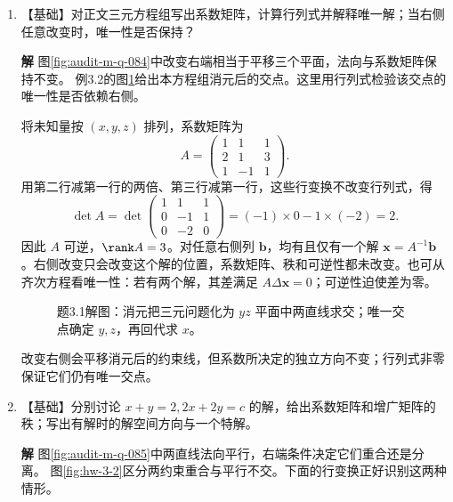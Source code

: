 \documentclass[11pt,openany,fontset=fandol]{ctexbook}
\theoremstyle{plain}\newtheorem{theorem}{定理}[chapter]\newtheorem{proposition}[theorem]{命题}
\theoremstyle{definition}\newtheorem{definition}{定义}[chapter]\newtheorem{example}{例}[chapter]
\theoremstyle{remark}\newtheorem*{remark}{说明}
\newcommand{\SolutionStart}{\par\nobreak\medskip\nobreak\noindent\textbf{解}\quad\ignorespaces}
\newenvironment{solution}{\SolutionStart}{\par\medskip}
\newcommand{\vct}[1]{\bm{#1}}\newcommand{\Rea}{\operatorname{Re}}\newcommand{\Ima}{\operatorname{Im}}
\begin{document}
\begin{enumerate}[label=3.\arabic*]
\item \begin{minipage}[t]{\linewidth}
【基础】对正文三元方程组写出系数矩阵，计算行列式并解释唯一解；当右侧任意改变时，唯一性是否保持？
\end{minipage}

\begin{solution}
图\ref{fig:audit-m-q-084}中改变右端相当于平移三个平面，法向与系数矩阵保持不变。
例3.2的图\ref{fig:hw-3-1}给出本方程组消元后的交点。这里用行列式检验该交点的唯一性是否依赖右侧。

将未知量按 $(x,y,z)$ 排列，系数矩阵为
\[
A=\begin{pmatrix}1&1&1\\2&1&3\\1&-1&1\end{pmatrix}.
\]
用第二行减第一行的两倍、第三行减第一行，这些行变换不改变行列式，得
\[
\det A=\det\begin{pmatrix}1&1&1\\0&-1&1\\0&-2&0\end{pmatrix}
=(-1)\times0-1\times(-2)=2.
\]
因此 $A$ 可逆，$\rank A=3$。对任意右侧列 $\vct b$，均有且仅有一个解 $\vct x=A^{-1}\vct b$。右侧改变只会改变这个解的位置，系数矩阵、秩和可逆性都未改变。也可从齐次方程看唯一性：若有两个解，其差满足 $A\Delta\vct x=0$；可逆性迫使差为零。

\begin{figure}[H]\centering
{}
\caption{题3.1解图：消元把三元问题化为 $yz$ 平面中两直线求交；唯一交点确定 $y,z$，再回代求 $x$。}\label{fig:hw-3-1}
\end{figure}

改变右侧会平移消元后的约束线，但系数所决定的独立方向不变；行列式非零保证它们仍有唯一交点。
\end{solution}

\item \begin{minipage}[t]{\linewidth}
【基础】分别讨论 $x+y=2,2x+2y=c$ 的解，给出系数矩阵和增广矩阵的秩；写出有解时的解空间方向与一个特解。
\end{minipage}

\begin{solution}
图\ref{fig:audit-m-q-085}中两直线法向平行，右端条件决定它们重合还是分离。
图\ref{fig:hw-3-2}区分两约束重合与平行不交。下面的行变换正好识别这两种情形。


\end{solution}
\end{enumerate}
\end{document}
